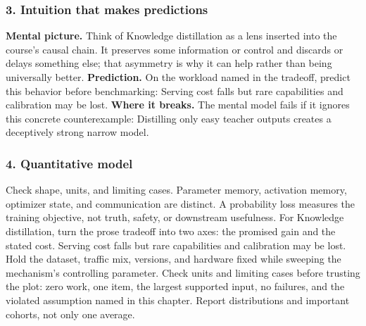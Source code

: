 \subsubsection*{3. Intuition that makes predictions}
\textbf{Mental picture.} Think of Knowledge distillation as a lens inserted into the course's causal chain. It preserves some information or control and discards or delays something else; that asymmetry is why it can help rather than being universally better.
\textbf{Prediction.} On the workload named in the tradeoff, predict this behavior before benchmarking: Serving cost falls but rare capabilities and calibration may be lost.
\textbf{Where it breaks.} The mental model fails if it ignores this concrete counterexample: Distilling only easy teacher outputs creates a deceptively strong narrow model.
\subsubsection*{4. Quantitative model}
Check shape, units, and limiting cases. Parameter memory, activation memory, optimizer state, and communication are distinct. A probability loss measures the training objective, not truth, safety, or downstream usefulness.
For Knowledge distillation, turn the prose tradeoff into two axes: the promised gain and the stated cost. Serving cost falls but rare capabilities and calibration may be lost. Hold the dataset, traffic mix, versions, and hardware fixed while sweeping the mechanism's controlling parameter.
Check units and limiting cases before trusting the plot: zero work, one item, the largest supported input, no failures, and the violated assumption named in this chapter. Report distributions and important cohorts, not only one average.
